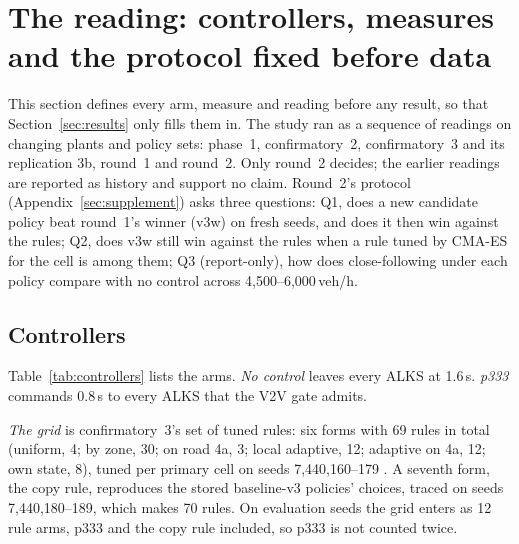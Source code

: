\section{The reading: controllers, measures and the protocol fixed before data}\label{sec:the_reading}

This section defines every arm, measure and reading before any result, so that Section~\ref{sec:results} only fills them in.
The study ran as a sequence of readings on changing plants and policy sets: phase~1, confirmatory~2, confirmatory~3 and its replication 3b, round~1 and round~2.
Only round~2 decides; the earlier readings are reported as history and support no claim.
Round~2's protocol (Appendix~\ref{sec:supplement}) asks three questions:
Q1, does a new candidate policy beat round~1's winner (v3w) on fresh seeds, and does it then win against the rules;
Q2, does v3w still win against the rules when a rule tuned by CMA-ES for the cell is among them;
Q3 (report-only), how does close-following under each policy compare with no control across 4,500--6,000\,veh/h.

\subsection{Controllers}\label{sec:controllers}

Table~\ref{tab:controllers} lists the arms.
\emph{No control} leaves every ALKS at 1.6\,s.
\emph{p333} commands 0.8\,s to every ALKS that the V2V gate admits.

\emph{The grid} is confirmatory~3's set of tuned rules: six forms with 69 rules in total (uniform, 4; by zone, 30; on road 4a, 3; local adaptive, 12; adaptive on 4a, 12; own state, 8), tuned per primary cell on seeds 7,440,160--179 .
A seventh form, the copy rule, reproduces the stored baseline-v3 policies' choices, traced on seeds 7,440,180--189, which makes 70 rules.
On evaluation seeds the grid enters as 12 rule arms, p333 and the copy rule included, so p333 is not counted twice.


